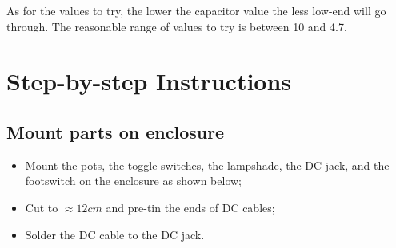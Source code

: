 \documentclass[a4paper,12pt]{article}
\begin{document}
As for the values to try, the lower the capacitor value the
less low-end will go through. The reasonable range of values
to try is between \SI{10}{\nF} and \SI{4.7}{\uF}.

\pagebreak

\section{Step-by-step Instructions}
\label{sec:steps}

\subsection{Mount parts on enclosure}

\begin{itemize}
  \item Mount the pots, the toggle switches, the lampshade,
    the DC jack, and the footswitch on the enclosure as
    shown below;
  \item Cut to $\approx12cm$ and pre-tin the ends of DC cables;
  \item Solder the DC cable to the DC jack.
\end{itemize}

\end{document}
